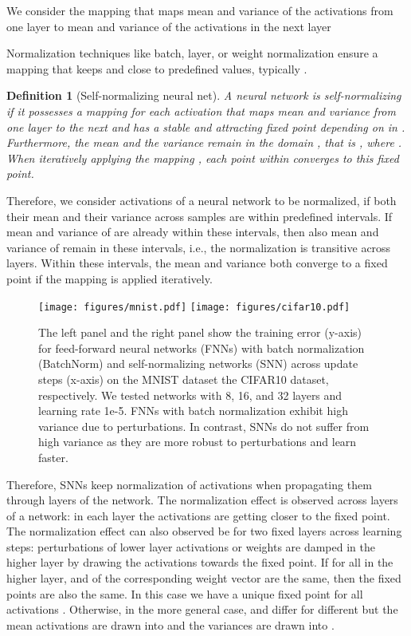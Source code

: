 \documentclass{article}
\newtheorem{definition}{Definition}
\begin{document}
We consider the mapping  that maps mean and variance of the activations from one layer
to mean and variance of the activations in the next layer 



Normalization techniques like batch, layer, or weight normalization 
ensure a mapping  that keeps 
 and 
close to predefined values, typically . 
\begin{definition}[Self-normalizing neural net] 
\label{def:SNN}
A neural network is self-normalizing if it possesses a mapping 
 for each activation  that maps mean and variance from one layer to the next 
and has a stable and attracting fixed point depending on  in .
Furthermore, the mean and the variance remain in the domain , that is , where
.
When iteratively applying the mapping , each point within  converges to this fixed point.
\end{definition}
Therefore, we consider activations of a neural network to be normalized, 
if both their mean and their variance across samples are within predefined intervals. 
If mean and variance of  are already within these intervals, then also
mean and variance of  remain in these intervals, i.e., the
normalization is transitive across layers. Within these intervals, 
the mean and variance both converge to a fixed point if the mapping  is applied
iteratively. 


\setlength{\belowcaptionskip}{0pt}
\begin{figure}
 \texttt{[image: figures/mnist.pdf]}
 \texttt{[image: figures/cifar10.pdf]}
 \caption[FNN and SNN trainin error curves]{The left panel and the right panel show the training error (y-axis) for feed-forward neural networks (FNNs) with batch
   normalization (BatchNorm) and self-normalizing networks (SNN) across update steps (x-axis)
   on the MNIST dataset the CIFAR10 dataset, respectively.  
   We tested networks with 8, 16, and 32 layers and learning rate 1e-5. FNNs 
   with batch normalization exhibit high variance due to perturbations. 
   In contrast, SNNs do not suffer from high variance as they are
   more robust to perturbations and learn faster.  \label{fig:perturb}}
\end{figure}


Therefore, SNNs
keep normalization of activations when propagating them 
through layers of the network. 
The normalization effect is observed across layers of a network: 
in each layer the activations are getting closer to the fixed point.
The normalization effect can also observed be for two fixed layers across learning steps: perturbations of lower layer activations or
weights are damped in the higher layer by drawing the activations
towards the fixed point.
If for all  in the higher layer, 
and  of the corresponding weight vector are the same, then
the fixed points are also the same. In this case we have a
unique fixed point for all activations . 
Otherwise, in the more general case, 
and  differ for different  but the mean activations are
drawn into  and the variances
are drawn into .
\end{document}
